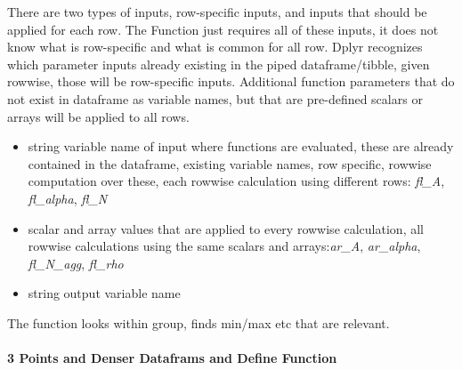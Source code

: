 \documentclass[
]{book}
\providecommand{\tightlist}{%
  \setlength{\itemsep}{0pt}\setlength{\parskip}{0pt}}
\begin{document}
There are two types of inputs, row-specific inputs, and inputs that should be applied for each row. The Function just requires all of these inputs, it does not know what is row-specific and what is common for all row. Dplyr recognizes which parameter inputs already existing in the piped dataframe/tibble, given rowwise, those will be row-specific inputs. Additional function parameters that do not exist in dataframe as variable names, but that are pre-defined scalars or arrays will be applied to all rows.

\begin{itemize}
\tightlist
\item
  \citet{param} string variable name of input where functions are evaluated, these are already contained in the dataframe, existing variable names, row specific, rowwise computation over these, each rowwise calculation using different rows: \emph{fl\_A}, \emph{fl\_alpha}, \emph{fl\_N}
\item
  \citet{param} scalar and array values that are applied to every rowwise calculation, all rowwise calculations using the same scalars and arrays:\emph{ar\_A}, \emph{ar\_alpha}, \emph{fl\_N\_agg}, \emph{fl\_rho}
\item
  \citet{param} string output variable name
\end{itemize}

The function looks within group, finds min/max etc that are relevant.

\hypertarget{points-and-denser-dataframs-and-define-function}{%
\paragraph{3 Points and Denser Dataframs and Define Function}\label{points-and-denser-dataframs-and-define-function}}
\end{document}
